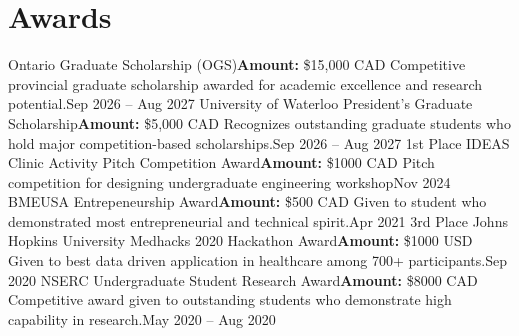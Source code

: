 \section{Awards}
\resumeSubHeadingListStart

    \resumeSubheading
      {Ontario Graduate Scholarship (OGS)}{\textbf{Amount:} \$15,000 CAD}
      {Competitive provincial graduate scholarship awarded for academic excellence and research potential.}{Sep 2026 -- Aug 2027}
    \resumeSubheading
      {University of Waterloo President’s Graduate Scholarship}{\textbf{Amount:} \$5,000 CAD}
      {Recognizes outstanding graduate students who hold major competition-based scholarships.}{Sep 2026 -- Aug 2027}
    \resumeSubheading
      {1st Place IDEAS Clinic Activity Pitch Competition Award}{\textbf{Amount:} \$1000 CAD}
      {Pitch competition for designing undergraduate engineering workshop}{Nov 2024}
    \resumeSubheading
      {BMEUSA Entrepeneurship Award}{\textbf{Amount:} \$500 CAD}
      {Given to student who demonstrated most entrepreneurial and technical spirit.}{Apr 2021}
    \resumeSubheading
      {3rd Place Johns Hopkins University Medhacks 2020 Hackathon Award}{\textbf{Amount:} \$1000 USD}
      {Given to best data driven application in healthcare among 700+ participants.}{Sep 2020}
    \resumeSubheading
      {NSERC Undergraduate Student Research Award}{\textbf{Amount:} \$8000 CAD}
      {Competitive award given to outstanding students who demonstrate high capability in research.}{May 2020 -- Aug 2020}
    
\resumeSubHeadingListEnd